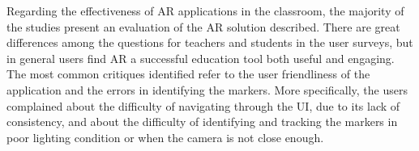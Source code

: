 Regarding the effectiveness of AR applications in the classroom, the majority of the studies present an evaluation of the \gls{AR} solution described. There are great differences among the questions for teachers and students in the user surveys, but in general users find \gls{AR} a successful education tool both useful and engaging. The most common critiques identified refer to the user friendliness of the application and the errors in identifying the markers. More specifically, the users complained about the difficulty of navigating through the UI, due to its lack of consistency, and about the difficulty of identifying and tracking the markers in poor lighting condition or when the camera is not close enough.